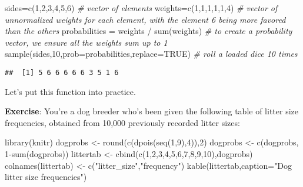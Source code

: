 \documentclass[
]{book}
\newenvironment{Shaded}{\begin{snugshade}}{\end{snugshade}}
\newcommand{\AttributeTok}[1]{\textcolor[rgb]{0.77,0.63,0.00}{#1}}
\newcommand{\CommentTok}[1]{\textcolor[rgb]{0.56,0.35,0.01}{\textit{#1}}}
\newcommand{\ConstantTok}[1]{\textcolor[rgb]{0.00,0.00,0.00}{#1}}
\newcommand{\DecValTok}[1]{\textcolor[rgb]{0.00,0.00,0.81}{#1}}
\newcommand{\FunctionTok}[1]{\textcolor[rgb]{0.00,0.00,0.00}{#1}}
\newcommand{\NormalTok}[1]{#1}
\newcommand{\OtherTok}[1]{\textcolor[rgb]{0.56,0.35,0.01}{#1}}
\newcommand{\SpecialCharTok}[1]{\textcolor[rgb]{0.00,0.00,0.00}{#1}}
\newcommand{\StringTok}[1]{\textcolor[rgb]{0.31,0.60,0.02}{#1}}
\begin{document}
\begin{Shaded}
\begin{Highlighting}[]
\NormalTok{sides}\OtherTok{=}\FunctionTok{c}\NormalTok{(}\DecValTok{1}\NormalTok{,}\DecValTok{2}\NormalTok{,}\DecValTok{3}\NormalTok{,}\DecValTok{4}\NormalTok{,}\DecValTok{5}\NormalTok{,}\DecValTok{6}\NormalTok{) }\CommentTok{\# vector of elements}
\NormalTok{weights}\OtherTok{=}\FunctionTok{c}\NormalTok{(}\DecValTok{1}\NormalTok{,}\DecValTok{1}\NormalTok{,}\DecValTok{1}\NormalTok{,}\DecValTok{1}\NormalTok{,}\DecValTok{1}\NormalTok{,}\DecValTok{4}\NormalTok{) }\CommentTok{\# vector of unnormalized weights for each element, with the element \textquotesingle{}6\textquotesingle{} being more favored than the others}
\NormalTok{probabilities }\OtherTok{=}\NormalTok{ weights }\SpecialCharTok{/} \FunctionTok{sum}\NormalTok{(weights) }\CommentTok{\# to create a probability vector, we ensure all the weights sum up to 1}
\FunctionTok{sample}\NormalTok{(sides,}\DecValTok{10}\NormalTok{,}\AttributeTok{prob=}\NormalTok{probabilities,}\AttributeTok{replace=}\ConstantTok{TRUE}\NormalTok{) }\CommentTok{\# roll a loaded dice 10 times}
\end{Highlighting}
\end{Shaded}

\begin{verbatim}
##  [1] 5 6 6 6 6 6 3 5 1 6
\end{verbatim}

Let's put this function into practice.

\textbf{Exercise}: You're a dog breeder who's been given the following table of litter size frequencies, obtained from 10,000 previously recorded litter sizes:

\begin{Shaded}
\begin{Highlighting}[]
\FunctionTok{library}\NormalTok{(knitr)}
\NormalTok{dogprobs }\OtherTok{\textless{}{-}} \FunctionTok{round}\NormalTok{(}\FunctionTok{c}\NormalTok{(}\FunctionTok{dpois}\NormalTok{(}\FunctionTok{seq}\NormalTok{(}\DecValTok{1}\NormalTok{,}\DecValTok{9}\NormalTok{),}\DecValTok{4}\NormalTok{)),}\DecValTok{2}\NormalTok{)}
\NormalTok{dogprobs }\OtherTok{\textless{}{-}} \FunctionTok{c}\NormalTok{(dogprobs, }\DecValTok{1}\SpecialCharTok{{-}}\FunctionTok{sum}\NormalTok{(dogprobs))}
\NormalTok{littertab }\OtherTok{\textless{}{-}} \FunctionTok{cbind}\NormalTok{(}\FunctionTok{c}\NormalTok{(}\DecValTok{1}\NormalTok{,}\DecValTok{2}\NormalTok{,}\DecValTok{3}\NormalTok{,}\DecValTok{4}\NormalTok{,}\DecValTok{5}\NormalTok{,}\DecValTok{6}\NormalTok{,}\DecValTok{7}\NormalTok{,}\DecValTok{8}\NormalTok{,}\DecValTok{9}\NormalTok{,}\DecValTok{10}\NormalTok{),dogprobs)}
\FunctionTok{colnames}\NormalTok{(littertab) }\OtherTok{\textless{}{-}} \FunctionTok{c}\NormalTok{(}\StringTok{"litter\_size"}\NormalTok{,}\StringTok{"frequency"}\NormalTok{)}
\FunctionTok{kable}\NormalTok{(littertab,}\AttributeTok{caption=}\StringTok{"Dog litter size frequencies"}\NormalTok{)}
\end{Highlighting}
\end{Shaded}
\end{document}
